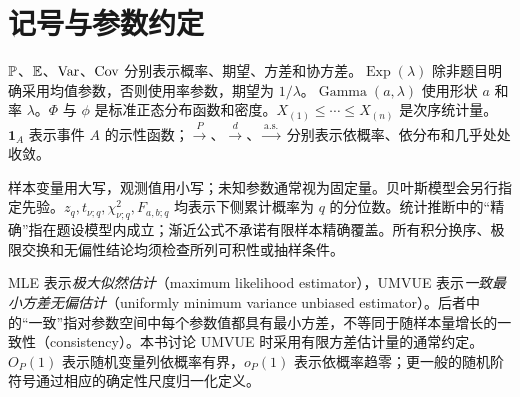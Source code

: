 \section*{记号与参数约定}
$\mathbb P$、$\mathbb E$、$\operatorname{Var}$、$\operatorname{Cov}$ 分别表示概率、期望、方差和协方差。$\operatorname{Exp}(\lambda)$ 除非题目明确采用均值参数，否则使用率参数，期望为 $1/\lambda$。$\operatorname{Gamma}(a,\lambda)$ 使用形状 $a$ 和率 $\lambda$。$\Phi$ 与 $\phi$ 是标准正态分布函数和密度。$X_{(1)}\le\cdots\le X_{(n)}$ 是次序统计量。$\mathbf1_A$ 表示事件 $A$ 的示性函数；$\xrightarrow{P}$、$\xrightarrow{d}$、$\xrightarrow{\mathrm{a.s.}}$ 分别表示依概率、依分布和几乎处处收敛。

样本变量用大写，观测值用小写；未知参数通常视为固定量。贝叶斯模型会另行指定先验。$z_q,t_{\nu;q},\chi^2_{\nu;q},F_{a,b;q}$ 均表示下侧累计概率为 $q$ 的分位数。统计推断中的“精确”指在题设模型内成立；渐近公式不承诺有限样本精确覆盖。所有积分换序、极限交换和无偏性结论均须检查所列可积性或抽样条件。

MLE 表示\emph{极大似然估计}（maximum likelihood estimator），UMVUE 表示\emph{一致最小方差无偏估计}（uniformly minimum variance unbiased estimator）。后者中的“一致”指对参数空间中每个参数值都具有最小方差，不等同于随样本量增长的一致性（consistency）。本书讨论 UMVUE 时采用有限方差估计量的通常约定。$O_P(1)$ 表示随机变量列依概率有界，$o_P(1)$ 表示依概率趋零；更一般的随机阶符号通过相应的确定性尺度归一化定义。
\tableofcontents
\clearpage







